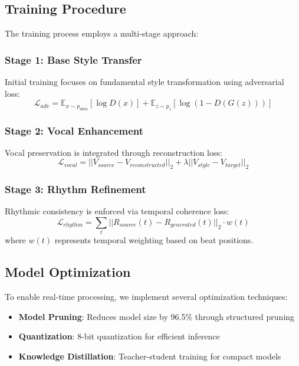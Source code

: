 \documentclass[conference]{IEEEtran}
\begin{document}
\subsection{Training Procedure}
The training process employs a multi-stage approach:

\subsubsection{Stage 1: Base Style Transfer}
Initial training focuses on fundamental style transformation using adversarial loss:
\begin{equation}
\mathcal{L}_{adv} = \mathbb{E}_{x \sim p_{data}} [\log D(x)] + \mathbb{E}_{z \sim p_z} [\log (1 - D(G(z)))]
\label{eq:adv_loss}
\end{equation}

\subsubsection{Stage 2: Vocal Enhancement}
Vocal preservation is integrated through reconstruction loss:
\begin{equation}
\mathcal{L}_{vocal} = ||V_{source} - V_{reconstructed}||_2 + \lambda ||V_{style} - V_{target}||_2
\label{eq:vocal_loss}
\end{equation}

\subsubsection{Stage 3: Rhythm Refinement}
Rhythmic consistency is enforced via temporal coherence loss:
\begin{equation}
\mathcal{L}_{rhythm} = \sum_t ||R_{source}(t) - R_{generated}(t)||_2 \cdot w(t)
\label{eq:rhythm_loss}
\end{equation}
where $w(t)$ represents temporal weighting based on beat positions.

\subsection{Model Optimization}
To enable real-time processing, we implement several optimization techniques:
\begin{itemize}
\item \textbf{Model Pruning}: Reduces model size by 96.5\% through structured pruning
\item \textbf{Quantization}: 8-bit quantization for efficient inference
\item \textbf{Knowledge Distillation}: Teacher-student training for compact models
\end{itemize}
\end{document}
